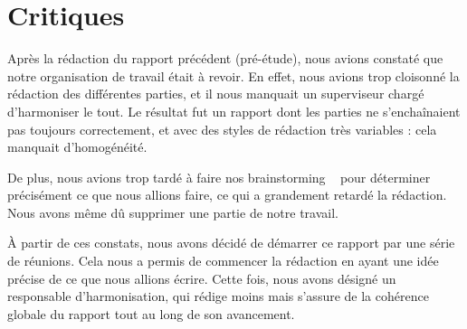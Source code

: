 \section{Critiques}
	Après la rédaction du rapport précédent (pré-étude), nous avions constaté que notre organisation de travail était à revoir. 
	En effet, nous avions trop cloisonné la rédaction des différentes parties, et il nous manquait un superviseur chargé d'harmoniser le tout.
	Le résultat fut un rapport dont les parties ne s'enchaînaient pas toujours correctement, et avec des styles de rédaction très variables : cela manquait d'homogénéité.

	De plus, nous avions trop tardé à faire nos \og brainstorming \fg~ pour déterminer précisément ce que nous allions faire, ce qui a grandement retardé la rédaction. Nous avons même dû supprimer une partie de notre travail.

	À partir de ces constats, nous avons décidé de démarrer ce rapport par une série de réunions. Cela nous a permis de commencer la rédaction en ayant une idée précise de ce que nous allions écrire.
	Cette fois, nous avons désigné un responsable d'harmonisation, qui rédige moins mais s'assure de la cohérence globale du rapport tout au long de son avancement.
